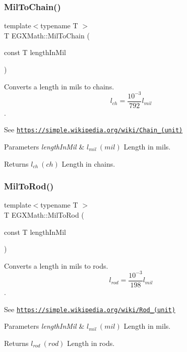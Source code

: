\subsubsection{\texorpdfstring{Mil\+To\+Chain()}{MilToChain()}}
{\footnotesize\ttfamily template$<$typename T $>$ \\
T E\+G\+X\+Math\+::\+Mil\+To\+Chain (\begin{DoxyParamCaption}\item[{const T}]{length\+In\+Mil }\end{DoxyParamCaption})}



Converts a length in mils to chains. \[ l_{ch}= \frac{10^{-3}}{792} l_{mil} \]. 

See \href{https://simple.wikipedia.org/wiki/Chain_(unit)}{\tt https\+://simple.\+wikipedia.\+org/wiki/\+Chain\+\_\+(unit)} 
\begin{DoxyParams}{Parameters}
{\em length\+In\+Mil} & $ l_{mil}\ (mil)$ Length in mils. \\
\hline
\end{DoxyParams}
\begin{DoxyReturn}{Returns}
$ l_{ch}\ (ch)$ Length in chains. 
\end{DoxyReturn}
\mbox{\label{group___e_g_x_math-_conversions-_length_conversions-_imperial-_mil-_surveyors_gae5721b0cf84304ecfade5a7808814329}} 
\subsubsection{\texorpdfstring{Mil\+To\+Rod()}{MilToRod()}}
{\footnotesize\ttfamily template$<$typename T $>$ \\
T E\+G\+X\+Math\+::\+Mil\+To\+Rod (\begin{DoxyParamCaption}\item[{const T}]{length\+In\+Mil }\end{DoxyParamCaption})}



Converts a length in mils to rods. \[ l_{rod}= \frac{10^{-3}}{198} l_{mil} \]. 

See \href{https://simple.wikipedia.org/wiki/Rod_(unit)}{\tt https\+://simple.\+wikipedia.\+org/wiki/\+Rod\+\_\+(unit)} 
\begin{DoxyParams}{Parameters}
{\em length\+In\+Mil} & $ l_{mil}\ (mil)$ Length in mils. \\
\hline
\end{DoxyParams}
\begin{DoxyReturn}{Returns}
$ l_{rod}\ (rod)$ Length in rods. 
\end{DoxyReturn}
